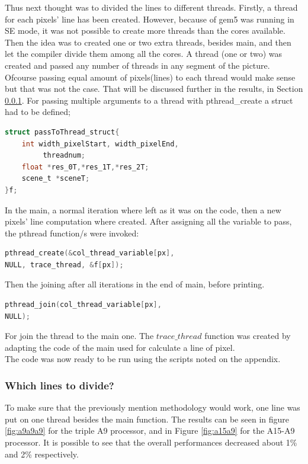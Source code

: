 \documentclass[journal]{IEEEtran}
\begin{document}
Thus next thought was to divided the lines to different threads. Firstly, a thread for each pixels’ line has been created. However, because of gem5 was running in SE mode, it was not possible to create more threads than the cores available. Then the idea was to created one or two extra threads, besides main, and then let the compiler divide them among all the cores. A thread (one or two) was created and passed any number of threads in any segment of the picture. Ofcourse passing equal amount of pixels(lines) to each thread would make sense but that was not the case. That will be discussed further in the results, in Section \ref{sec:res}.
For passing multiple arguments to a thread with pthread\_create a struct had to be defined;
\begin{lstlisting}[language=C,caption={Struct for thread defined}]
struct passToThread_struct{
    int width_pixelStart, width_pixelEnd,
         threadnum;
    float *res_0T,*res_1T,*res_2T;
    scene_t *sceneT;
}f;
\end{lstlisting}
In the main, a normal iteration where left as it was on the code, then a new pixels' line computation where created. After assigning all the variable to pass, the pthread function/s were invoked:
\begin{lstlisting}[language=c,caption={Creating threads}]
pthread_create(&col_thread_variable[px],
NULL, trace_thread, &f[px]);
\end{lstlisting} 
Then the joining after all iterations in the end of main, before printing.  
\begin{lstlisting}[language=c,caption={Joining threads }]
pthread_join(col_thread_variable[px], 
NULL);
\end{lstlisting}
For join the thread to the main one.
The \(trace\_thread\) function was created by adapting the code of the main used for calculate a line of pixel.\\

The code was now ready to be run using the scripts noted on the appendix.



\subsubsection{Which lines to divide?}
\label{sec:res}
To make sure that the previously mention methodology would work, one line was put on one thread besides the main function. The results can be seen in figure \ref{fig:a9a9a9} for the triple A9 processor, and in Figure \ref{fig:a15a9} for the A15-A9 processor. It is possible to see that the overall performances decreased about 1\% and 2\% respectively.
\end{document}
